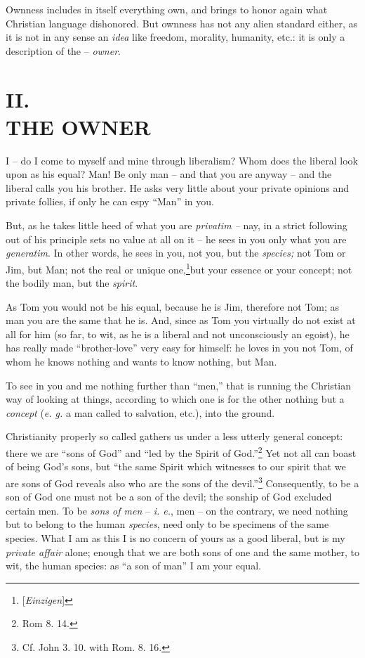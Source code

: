 \documentclass[12pt,a4paper]{book}
\begin{document}
Ownness includes in itself everything own, and brings to honor again what 
Christian language dishonored. But ownness has not any alien standard either, 
as it is not in any sense an \textit{idea} like freedom, morality, humanity, 
etc.: it is only a description of the -- \textit{owner}.

\chapter[II. The Owner]{\centering II.\\
THE OWNER}

I -- do I come to myself and mine through liberalism? Whom does the liberal 
look upon as his equal? Man! Be only man -- and that you are anyway -- and the 
liberal calls you his brother. He asks very little about your private opinions 
and private follies, if only he can espy ``Man'' in you.

But, as he takes little heed of what you are \textit{privatim --} nay, in a 
strict following out of his principle sets no value at all on it -- he sees in 
you only what you are \textit{generatim}. In other words, he sees in you, not 
you, but the \textit{species;} not Tom or Jim, but Man; not the real or unique 
one,\footnote{[\textit{Einzigen}] }but your essence or your concept; not the 
bodily man, but the \textit{spirit}.

As Tom you would not be his equal, because he is Jim, therefore not Tom; as 
man you are the same that he is. And, since as Tom you virtually do not exist 
at all for him (so far, to wit, as he is a liberal and not unconsciously an 
egoist), he has really made ``brother-love'' very easy for himself: he loves 
in you not Tom, of whom he knows nothing and wants to know nothing, but Man.

To see in you and me nothing further than ``men,'' that is running the 
Christian way of looking at things, according to which one is for the other 
nothing but a \textit{concept} (\textit{e. g.} a man called to salvation, 
etc.), into the ground.

Christianity properly so called gathers us under a less utterly general 
concept: there we are ``sons of God'' and ``led by the Spirit of 
God.''\footnote{Rom 8. 14.} Yet not all can boast of being God's sons, but 
``the same Spirit which witnesses to our spirit that we are sons of God 
reveals also who are the sons of the devil.''\footnote{Cf. John 3. 10. with 
Rom. 8. 16.} Consequently, to be a son of God one must not be a son of the 
devil; the sonship of God excluded certain men. To be \textit{sons of men} -- 
\textit{i. e.}, men -- on the contrary, we need nothing but to belong to the 
human \textit{species}, need only to be specimens of the same species. What I 
am as this I is no concern of yours as a good liberal, but is my 
\textit{private affair} alone; enough that we are both sons of one and the 
same mother, to wit, the human species: as ``a son of man'' I am your equal.
\end{document}
